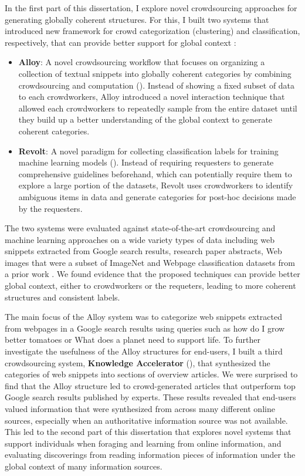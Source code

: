 In the first part of this dissertation, I explore novel crowdsourcing approaches for generating globally coherent structures. For this, I built two systems that introduced new framework for crowd categorization (clustering) and classification, respectively, that can provide better support for global context : 

\begin{itemize}
    \item \textbf{Alloy}: A novel crowdsourcing workflow that focuses on organizing a collection of textual snippets into globally coherent categories by combining crowdsourcing and computation (). Instead of showing a fixed subset of data to each crowdworkers, Alloy introduced a novel interaction technique that allowed each crowdworkers to repeatedly sample from the entire dataset until they build up a better understanding of the global context to generate coherent categories. 

    \item \textbf{Revolt}: A novel paradigm for collecting classification labels for training machine learning models (). Instead of requiring requesters to generate comprehensive guidelines beforehand, which can potentially require them to explore a large portion of the datasets, Revolt uses crowdworkers to identify ambiguous items in data and generate categories for post-hoc decisions made by the requesters.
\end{itemize}


The two systems were evaluated against state-of-the-art crowdsourcing and machine learning approaches on a wide variety types of data including web snippets extracted from Google search results, research paper abstracts, Web images that were a subset of ImageNet \cite{deng2009imagenet} and Webpage classification datasets from a prior work \cite{kulesza2014structured}. We found evidence that the proposed techniques can provide better global context, either to crowdworkers or the requeters, leading to more coherent structures and consistent labels.

The main focus of the Alloy system was to categorize web snippets extracted from webpages in a Google search results using queries such as how do I grow better tomatoes or What does a planet need to support life. To further investigate the usefulness of the Alloy structures for end-users, I built a third crowdsourcing system, \textbf{Knowledge Accelerator} (), that synthesized the categories of web snippets into sections of overview articles. We were surprised to find that the Alloy structure led to crowd-generated articles that outperform top Google search results published by experts. These results revealed that end-users valued information that were synthesized from across many different online sources, especially when an authoritative information source was not available. This led to the second part of this dissertation that explores novel systems that support individuals when foraging and learning from online information, and evaluating discoverings from reading information pieces of information under the global context of many information sources.

